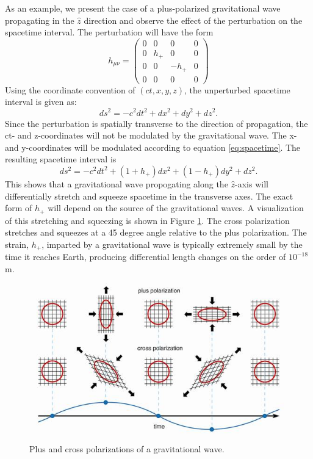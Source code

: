 As an example, we present the case of a plus-polarized gravitational wave 
propagating in the $\hat{z}$ direction and observe the effect of the perturbation 
on the spacetime interval. The perturbation will have the form 
\begin{equation}
h_{\mu\nu} = 
  \begin{pmatrix}
    0 & 0 & 0 & 0 \\
    0 & h_+ & 0 & 0 \\
    0 & 0 & -h_+ & 0 \\
    0 & 0 & 0 & 0
  \end{pmatrix}
\end{equation}
Using the coordinate convention of $(ct,x,y,z)$, the unperturbed
spacetime interval is given as: 
\begin{equation}
ds^2 = -c^2 dt^2 + dx^2 + dy^2 + dz^2.
\end{equation}
Since the perturbation is spatially transverse to the direction of 
propagation, the ct- and z-coordinates will not be modulated by the 
gravitational wave. The x- and y-coordinates will be modulated  
according to equation \ref{eq:spacetime}. The resulting spacetime 
interval is
\begin{equation}
ds^2 = -c^2 dt^2 + (1 + h_+)dx^2 + (1 - h_+)dy^2 + dz^2.
\end{equation}
This shows that a gravitational wave propogating along the $\hat{z}$-axis 
will differentially stretch and squeeze spacetime in the transverse 
axes. The exact form of $h_+$ will depend on the source of the 
gravitational waves. A visualization of this stretching and squeezing 
is shown in Figure \ref{fig:polarizations}\cite{Polarization}. The cross polarization  
stretches and squeezes at a 45 degree angle relative to the plus 
polarization. The strain, $h_+$, imparted by a gravitational wave is 
typically extremely small by the time it reaches Earth, producing 
differential length changes on the order of $10^{-18}$m. 

\begin{figure}[ht!]
\includegraphics[width=\textwidth]{figures/introduction/polarisations2}
\caption[Plus and cross polarizations]{Plus and cross polarizations %
         of a gravitational wave.}
\label{fig:polarizations}
\end{figure}

